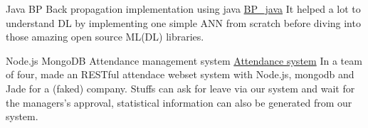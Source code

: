 \documentclass[utf8]{twentysecondcv} %
\begin{document}
\begin{twenty}
        \twentyitem
        {Java}
       	{BP}
        {Back propagation implementation using java}
        {\href{https://github.com/MiaoDX/bp_java}{BP\_java}}
        {}                
        {It helped a lot to understand DL by implementing one simple ANN from scratch before diving into those amazing open source ML(\/DL) libraries.}
		
		\twentyitem
        {Node.js}
        {MongoDB}
        {Attendance management system}
        {\href{https://github.com/SEAPC2016/attendance}{Attendance system}}
        {}
        {In a team of four, made an RESTful attendace webset system with Node.js, mongodb and Jade for a (faked) company. Stuffs can ask for leave via our system and wait for the managers's approval, statistical information can also be generated from our system.}


\end{twenty}







\end{document}
